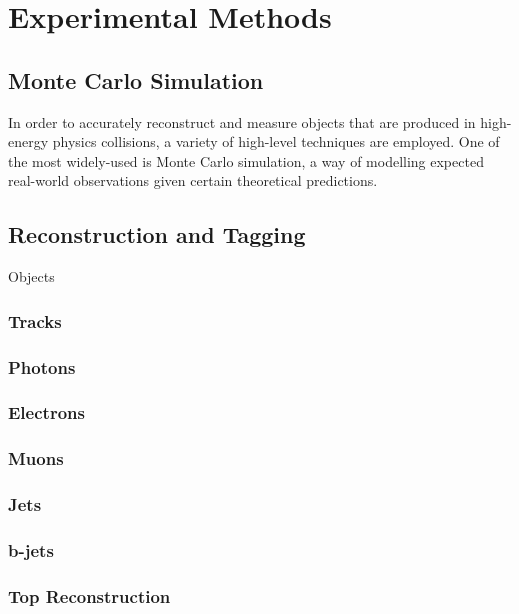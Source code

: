 \section{Experimental Methods} \label{sec:methods} 

\subsection{Monte Carlo Simulation} \label{sec:MC} 
In order to accurately reconstruct and measure objects that are produced in high-energy physics collisions, a variety of high-level techniques are employed. One of the most widely-used is Monte Carlo simulation, a way of modelling expected real-world observations given certain theoretical predictions. 


\subsection{Reconstruction and Tagging} \label{sec:Reco} 

Objects 


\subsubsection{Tracks} \label{sec:Tracks} 

\subsubsection{Photons} \label{sec:Photons} 

\subsubsection{Electrons} \label{sec:Photons} 

\subsubsection{Muons} \label{sec:Muons} 

\subsubsection{Jets} \label{sec:Jets} 

\subsubsection{b-jets} \label{sec:b-jets} 

\subsubsection{Top Reconstruction} \label{sec:top} 

